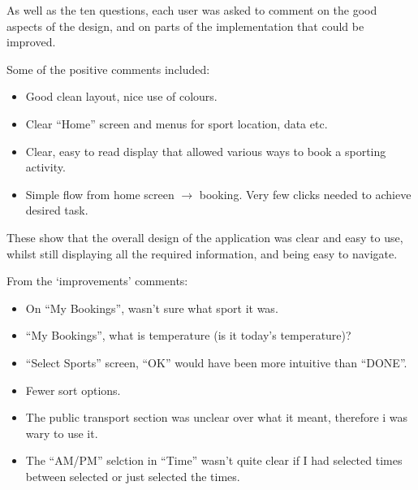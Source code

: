 As well as the ten questions, each user was asked to comment on the good
aspects of the design, and on parts of the implementation that could be
improved.

Some of the positive comments included:
\begin{itemize}
	\item Good clean layout, nice use of colours.
	\item Clear ``Home'' screen and menus for sport location, data etc.
	\item Clear, easy to read display that allowed various ways to book a
		sporting activity.
	\item Simple flow from home screen $\rightarrow$ booking. Very few clicks
		needed to achieve desired task.
\end{itemize}

These show that the overall design of the application was clear and easy to
use, whilst still displaying all the required information, and being easy to
navigate.

From the `improvements' comments:
\begin{itemize}
	\item On ``My Bookings'', wasn't sure what sport it was.
	\item ``My Bookings'', what is temperature (is it today's temperature)?
	\item ``Select Sports'' screen, ``OK'' would have been more intuitive than
		``DONE''.
	\item Fewer sort options.
	\item The public transport section was unclear over what it meant,
		therefore i was wary to use it.
	\item The ``AM/PM'' selction in ``Time'' wasn't quite clear if I had
		selected times between selected or just selected the times.
\end{itemize}

